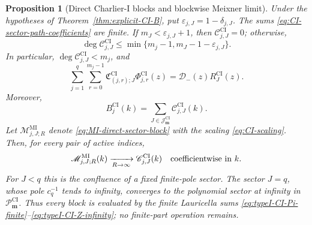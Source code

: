 \documentclass[10pt]{amsart}
\newcommand{\mm}{\boldsymbol m}
\theoremstyle{plain}
\newtheorem{proposition}[theorem]{Proposition}
\theoremstyle{definition}
\theoremstyle{remark}
\begin{document}
\begin{proposition}[Direct Charlier-I blocks and blockwise Meixner limit]
\label{prop:CI-sector-blocks}
Under the hypotheses of Theorem~\ref{thm:explicit-CI-B}, put
\(\varepsilon_{j,J}=1-\delta_{j,J}\). The sums
\eqref{eq:CI-sector-path-coefficients} are finite. If
\(m_J<\varepsilon_{j,J}+1\), then
\(\mathscr C_{j,J}^{\mathrm{CI}}=0\); otherwise,
\begin{equation}
 \deg\mathscr C_{j,J}^{\mathrm{CI}}
 \le\min\{m_j-1,m_J-1-\varepsilon_{j,J}\}.
 \label{eq:CI-direct-sector-degree}
\end{equation}
In particular, \(\deg\mathscr C_{j,J}^{\mathrm{CI}}<m_j\), and
\begin{equation}
 \sum_{j=1}^q\sum_{r=0}^{m_j-1}
 \mathfrak C_{(j,r);J}^{\mathrm{CI}}
 \Phi_{j,r}^{\mathrm{CI}}(z)
 =\mathcal D_-(z)R_J^{\mathrm{CI}}(z).
 \label{eq:CI-direct-sector-identity}
\end{equation}
Moreover,
\begin{equation}
 B_j^{\mathrm{CI}}(k)
 =\sum_{J\in\mathcal J_{\mm}^{\mathrm{CI}}}
 \mathscr C_{j,J}^{\mathrm{CI}}(k).
 \label{eq:CI-direct-sector-decomposition}
\end{equation}
Let \(\mathscr M_{j,J;R}^{\mathrm{MI}}\) denote
\eqref{eq:MI-direct-sector-block} with the scaling
\eqref{eq:CI-scaling}. Then, for every pair of active indices,
\begin{equation}
 \mathscr M_{j,J;R}^{\mathrm{MI}}(k)
 \xrightarrow[R\to\infty]{}
 \mathscr C_{j,J}^{\mathrm{CI}}(k)
 \quad\hbox{coefficientwise in }k.
 \label{eq:MI-CI-blockwise-limit}
\end{equation}
For \(J<q\) this is the confluence of a fixed finite-pole sector. The
sector \(J=q\), whose pole \(c_q^{-1}\) tends to infinity, converges to
the polynomial sector at infinity in
\(\mathscr P_{\boldsymbol m}^{\mathrm{CI}}\). Thus every block is
evaluated by the finite Lauricella sums
\eqref{eq:typeI-CI-Pi-finite}--\eqref{eq:typeI-CI-Z-infinity};
no finite-part operation remains.
\end{proposition}
\end{document}
